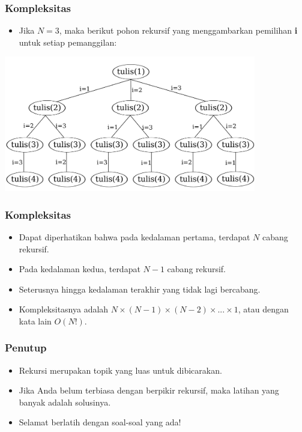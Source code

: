 \begin{frame}[fragile]
\frametitle{Kompleksitas}
\begin{itemize}
  \item Jika $N=3$, maka berikut pohon rekursif yang menggambarkan pemilihan \textbf{i} untuk setiap pemanggilan:
\end{itemize}   
\includegraphics[width=11cm]{asset/permutasi.pdf}
\end{frame}

\begin{frame}[fragile]
\frametitle{Kompleksitas}
\begin{itemize}
  \item Dapat diperhatikan bahwa pada kedalaman pertama, terdapat $N$ cabang rekursif.
  \item Pada kedalaman kedua, terdapat $N-1$ cabang rekursif.
  \item Seterusnya hingga kedalaman terakhir yang tidak lagi bercabang.
  \item Kompleksitasnya adalah $N \times (N-1) \times (N-2) \times ... \times 1$, atau dengan kata lain $O(N!)$.
\end{itemize}   
\end{frame}

\begin{frame}
\frametitle{Penutup}
\begin{itemize}
  \item Rekursi merupakan topik yang luas untuk dibicarakan.
  \item Jika Anda belum terbiasa dengan berpikir rekursif, maka latihan yang banyak adalah solusinya.
  \item Selamat berlatih dengan soal-soal yang ada!
\end{itemize}   
\end{frame}


